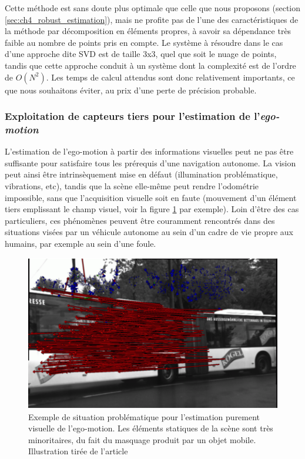 Cette méthode est sans doute plus optimale que celle que nous proposons (section \ref{sec:ch4_robust_estimation}), mais ne profite pas de l'une des caractéristiques de la méthode par décomposition en éléments propres, à savoir sa dépendance très faible au nombre de points pris en compte. Le système à résoudre dans le cas d'une approche dite \og SVD\fg{} est de taille 3x3, quel que soit le nuage de points, tandis que cette approche conduit à un système dont la complexité est de l'ordre de $O(N^2)$. Les temps de calcul attendus sont donc relativement importants, ce que nous souhaitons éviter, au prix d'une perte de précision probable.

\subsubsection{Exploitation de capteurs tiers pour l'estimation de l'\textit{ego-motion}}
L'estimation de l'ego-motion à partir des informations visuelles peut ne pas être suffisante pour satisfaire tous les prérequis d'une navigation autonome. La vision peut ainsi être intrinsèquement mise en défaut (illumination problématique, vibrations, etc), tandis que la scène elle-même peut rendre l'odométrie impossible, sans que l'acquisition visuelle soit en faute (mouvement d'un élément tiers emplissant le champ visuel, voir la figure \ref{fig:ch4_egomotion_vision_problem} par exemple). Loin d'être des cas particuliers, ces phénomènes peuvent être couramment rencontrés dans des situations visées par un véhicule autonome au sein d'un cadre de vie propre aux humains, par exemple au sein d'une foule. \\

\begin{figure}
	\centering
	\includegraphics{Chapter4/graphics/problematic_scene.png}
	\caption{Exemple de situation problématique pour l'estimation purement visuelle de l'ego-motion. Les éléments statiques de la scène sont très minoritaires, du fait du masquage produit par un objet mobile. Illustration tirée de l'article \cite{Badino2008}}	
	\label{fig:ch4_egomotion_vision_problem}
\end{figure}

